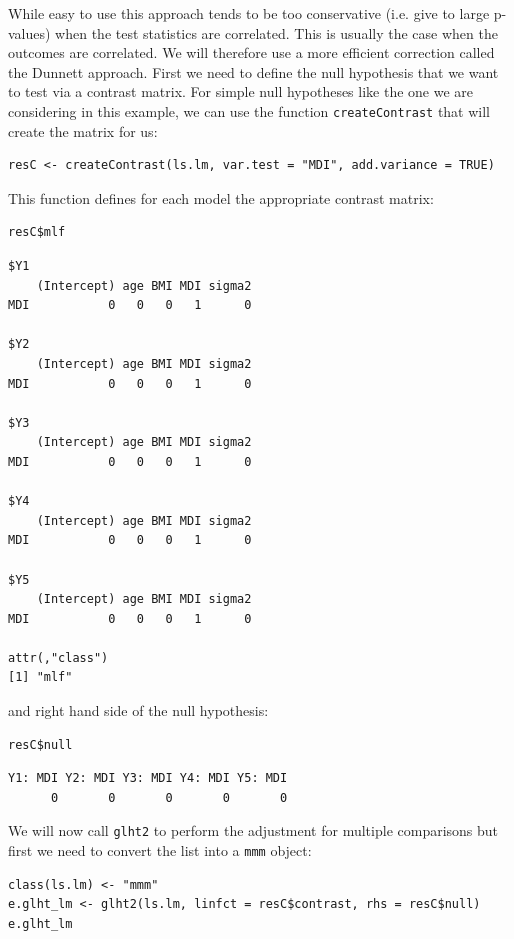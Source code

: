 \documentclass{article}
\begin{document}
While easy to use this approach tends to be too conservative
(i.e. give to large p-values) when the test statistics are
correlated. This is usually the case when the outcomes are
correlated. We will therefore use a more efficient correction called
the Dunnett approach. First we need to define the null hypothesis
that we want to test via a contrast matrix. For simple null hypotheses
like the one we are considering in this example, we can use the
function \texttt{createContrast} that will create the matrix for us:
\lstset{language=r,label= ,caption= ,captionpos=b,numbers=none}
\begin{lstlisting}
resC <- createContrast(ls.lm, var.test = "MDI", add.variance = TRUE)
\end{lstlisting}

This function defines for each model the appropriate contrast matrix:
\lstset{language=r,label= ,caption= ,captionpos=b,numbers=none}
\begin{lstlisting}
resC$mlf
\end{lstlisting}
\begin{verbatim}
$Y1
    (Intercept) age BMI MDI sigma2
MDI           0   0   0   1      0

$Y2
    (Intercept) age BMI MDI sigma2
MDI           0   0   0   1      0

$Y3
    (Intercept) age BMI MDI sigma2
MDI           0   0   0   1      0

$Y4
    (Intercept) age BMI MDI sigma2
MDI           0   0   0   1      0

$Y5
    (Intercept) age BMI MDI sigma2
MDI           0   0   0   1      0

attr(,"class")
[1] "mlf"
\end{verbatim}

and right hand side of the null hypothesis:
\lstset{language=r,label= ,caption= ,captionpos=b,numbers=none}
\begin{lstlisting}
resC$null
\end{lstlisting}

\begin{verbatim}
Y1: MDI Y2: MDI Y3: MDI Y4: MDI Y5: MDI 
      0       0       0       0       0
\end{verbatim}

\clearpage

We will now call \texttt{glht2} to perform the adjustment for multiple
comparisons but first we need to convert the list into a \texttt{mmm} object:
\lstset{language=r,label= ,caption= ,captionpos=b,numbers=none}
\begin{lstlisting}
class(ls.lm) <- "mmm"
e.glht_lm <- glht2(ls.lm, linfct = resC$contrast, rhs = resC$null)
e.glht_lm
\end{lstlisting}
\end{document}
